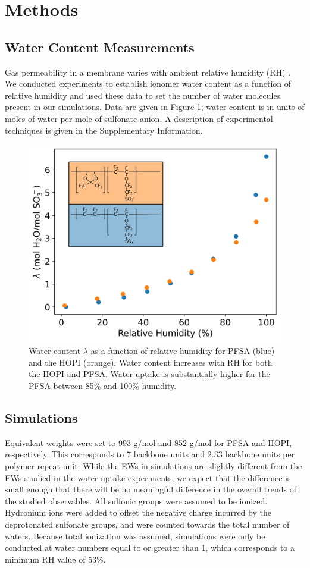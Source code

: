 \documentclass[journal=jacsat,manuscript=article]{achemso}
\begin{document}
\section{Methods}
\subsection{Water Content Measurements}
Gas permeability in a membrane varies with ambient relative humidity (RH) \cite{broka_oxygen_1997,novitski_determination_2015,schalenbach_gas_2015}. We conducted experiments to establish ionomer water content as a function of relative humidity and used these data to set the number of water molecules present in our simulations. Data are given in Figure \ref{fig:water-number}; water content is in units of moles of water per mole of sulfonate anion. A description of experimental techniques is given in the Supplementary Information. 

\begin{figure}
    \centering
    \includegraphics[width=0.9\linewidth]{humidity.png}
    \caption{Water content $\lambda$ as a function of relative humidity for PFSA (blue) and the HOPI (orange). Water content increases with RH for both the HOPI and PFSA. Water uptake is substantially higher for the PFSA between 85\% and 100\% humidity.} 
    \label{fig:water-number}
\end{figure}


\subsection{Simulations}
Equivalent weights were set to 993 g/mol and 852 g/mol for PFSA and HOPI, respectively. This corresponds to 7 backbone units and 2.33 backbone units per polymer repeat unit. While the EWs in simulations are slightly different from the EWs studied in the water uptake experiments, we expect that the difference is small enough that there will be no meaningful difference in the overall trends of the studied observables. All sulfonic groups were assumed to be ionized. Hydronium ions were added to offset the negative charge incurred by the deprotonated sulfonate groups, and were counted towards the total number of waters. Because total ionization was assumed, simulations were only be conducted at water numbers equal to or greater than 1, which corresponds to a minimum RH value of 53\%.  
\end{document}
